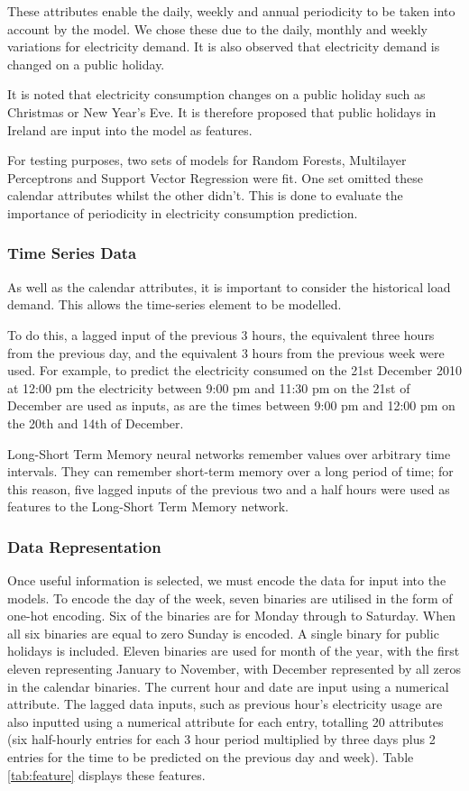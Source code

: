 These attributes enable the daily, weekly and annual periodicity to be taken into account by the model. We chose these due to the daily, monthly and weekly variations for electricity demand. It is also observed that electricity demand is changed on a public holiday.

It is noted that electricity consumption changes on a public holiday such as Christmas or New Year's Eve. It is therefore proposed that public holidays in Ireland are input into the model as features. 

For testing purposes, two sets of models for Random Forests, Multilayer Perceptrons and Support Vector Regression were fit. One set omitted these calendar attributes whilst the other didn't. This is done to evaluate the importance of periodicity in electricity consumption prediction.

\subsubsection{Time Series Data}

As well as the calendar attributes, it is important to consider the historical load demand. This allows the time-series element to be modelled.  

To do this, a lagged input of the previous 3 hours, the equivalent three hours from the previous day, and the equivalent 3 hours from the previous week were used. For example, to predict the electricity consumed on the 21st December 2010 at 12:00 pm the electricity between 9:00 pm and 11:30 pm on the 21st of December are used as inputs, as are the times between 9:00 pm and 12:00 pm on the 20th and 14th of December.

Long-Short Term Memory neural networks remember values over arbitrary time intervals. They can remember short-term memory over a long period of time; for this reason, five lagged inputs of the previous two and a half hours were used as features to the Long-Short Term Memory network.

\subsubsection{Data Representation}

Once useful information is selected, we must encode the data for input into the models. To encode the day of the week, seven binaries are utilised in the form of one-hot encoding. Six of the binaries are for Monday through to Saturday. When all six binaries are equal to zero Sunday is encoded. A single binary for public holidays is included. Eleven binaries are used for month of the year, with the first eleven representing January to November, with December represented by all zeros in the calendar binaries. The current hour and date are input using a numerical attribute. The lagged data inputs, such as previous hour's electricity usage are also inputted using a numerical attribute for each entry, totalling 20 attributes (six half-hourly entries for each 3 hour period multiplied by three days plus 2 entries for the time to be predicted on the previous day and week). Table \ref{tab:feature} displays these features.


